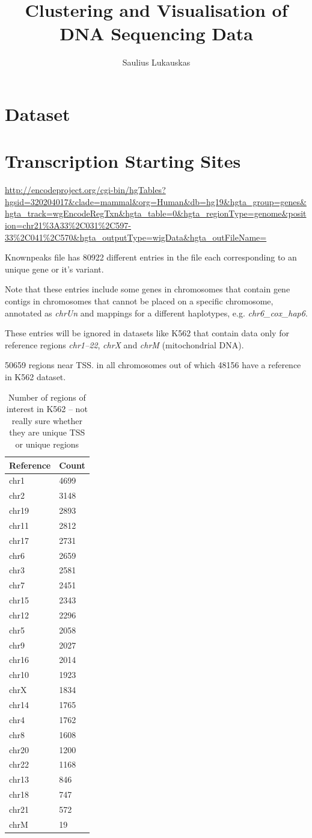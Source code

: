 \documentclass[10pt,a4paper]{article}
\author{Saulius Lukauskas}
\title{Clustering and Visualisation of DNA Sequencing Data}
\begin{document}
\section{Dataset}
\section{Transcription Starting Sites}
\url{http://encodeproject.org/cgi-bin/hgTables?hgsid=320204017&clade=mammal&org=Human&db=hg19&hgta_group=genes&hgta_track=wgEncodeRegTxn&hgta_table=0&hgta_regionType=genome&position=chr21%
}

Knownpeaks file has 80922 different entries in the file each corresponding to an unique gene or it's variant.

Note that these entries include some genes in
chromosomes that contain gene contigs in chromosomes that cannot be placed on a specific chromosome,
 annotated as \emph{chrUn} and mappings for a different haplotypes, e.g. \emph{chr6\_cox\_hap6}.
 
These entries will be ignored in datasets like K562 that contain data only for reference regions \emph{chr1--22}, \emph{chrX} and 
\emph{chrM} (mitochondrial DNA).

50659 regions near TSS. in all chromosomes
out of which 48156 have a reference in K562 dataset.

\begin{table}
\begin{tabular}{ll}
\textbf{Reference} & \textbf{Count} \\
\hline
chr1 & 4699 \\
chr2 & 3148 \\
chr19 & 2893 \\
chr11 & 2812 \\
chr17 & 2731 \\
chr6 &  2659 \\
chr3 &  2581 \\
chr7 &  2451 \\
chr15 & 2343 \\
chr12 & 2296 \\
chr5 &  2058 \\
chr9 &  2027 \\
chr16 & 2014 \\
chr10 & 1923 \\
chrX &  1834 \\
chr14 & 1765 \\
chr4 &  1762 \\
chr8 &  1608 \\
chr20 & 1200 \\
chr22 & 1168 \\
chr13 &  846 \\
chr18 &  747 \\
chr21 &  572 \\
chrM &    19 \\
\end{tabular}
\label{table:K562_Regions_of_interest}
\caption{Number of regions of interest in K562 -- not really sure whether they are unique TSS or unique regions}
\end{table}
\end{document}
